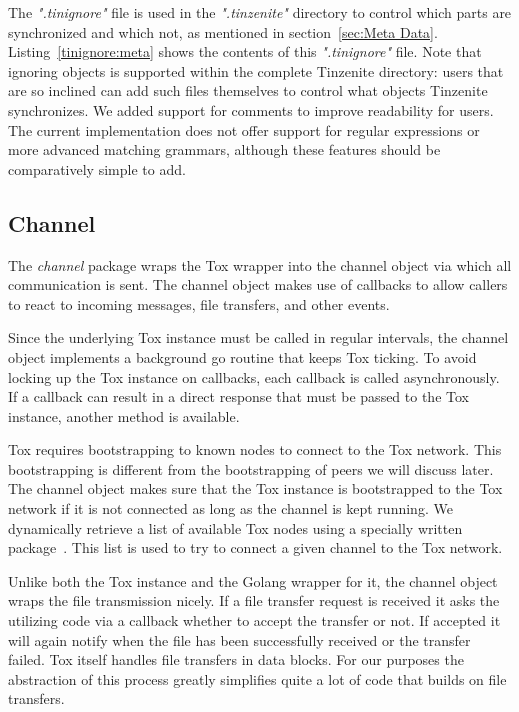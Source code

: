 The \textit{".tinignore"} file is used in the \textit{".tinzenite"} directory to control which parts are synchronized and which not, as mentioned in section~\ref{sec:Meta Data}.
Listing~\ref{tinignore:meta} shows the contents of this \textit{".tinignore"} file.
Note that ignoring objects is supported within the complete Tinzenite directory: users that are so inclined can add such files themselves to control what objects Tinzenite synchronizes.
We added support for comments to improve readability for users.
The current implementation does not offer support for regular expressions or more advanced matching grammars, although these features should be comparatively simple to add.

\subsection{Channel}
\label{sub:Channel}

The \emph{channel} package wraps the Tox wrapper into the channel object via which all communication is sent.
The channel object makes use of callbacks to allow callers to react to incoming messages, file transfers, and other events.

Since the underlying Tox instance must be called in regular intervals, the channel object implements a background go routine that keeps Tox ticking.
To avoid locking up the Tox instance on callbacks, each callback is called asynchronously.
If a callback can result in a direct response that must be passed to the Tox instance, another method is available.

Tox requires bootstrapping to known nodes to connect to the Tox network.
This bootstrapping is different from the bootstrapping of peers we will discuss later.
The channel object makes sure that the Tox instance is bootstrapped to the Tox network if it is not connected as long as the channel is kept running.
We dynamically retrieve a list of available Tox nodes using a specially written package~\cite{web:site:github:tox-dynboot}.
This list is used to try to connect a given channel to the Tox network.

Unlike both the Tox instance and the Golang wrapper for it, the channel object wraps the file transmission nicely.
If a file transfer request is received it asks the utilizing code via a callback whether to accept the transfer or not.
If accepted it will again notify when the file has been successfully received or the transfer failed.
Tox itself handles file transfers in data blocks.
For our purposes the abstraction of this process greatly simplifies quite a lot of code that builds on file transfers.

